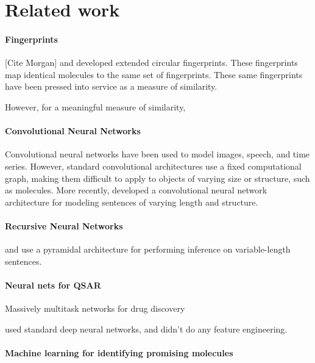 \documentclass{article}
\begin{document}
\section{Related work}

\paragraph{Fingerprints}

[Cite Morgan] and \cite{ECFP2010} developed extended circular fingerprints.
These fingerprints map identical molecules to the same set of fingerprints.
These same fingerprints have been pressed into service as a measure of similarity.

However, for a meaningful measure of similarity, 

\paragraph{Convolutional Neural Networks}

Convolutional neural networks have been used to model images, speech, and time series\cite{lecun1995convolutional}.
However, standard convolutional architectures use a fixed computational graph, making them difficult to apply to objects of varying size or structure, such as molecules.
More recently, \cite{KalchbrennerACL2014} developed a convolutional neural network architecture for modeling sentences of varying length and structure.

\paragraph{Recursive Neural Networks}

\cite{socher2011semi} and \cite{socher2011dynamic} use a pyramidal architecture for performing inference on variable-length sentences.

\paragraph{Neural nets for QSAR}

\cite{ramsundar2015massively} Massively multitask networks for drug discovery

\cite{dahl2014multi} used standard deep neural networks, and didn't do any feature engineering.

\paragraph{Machine learning for identifying promising molecules}
\end{document}
